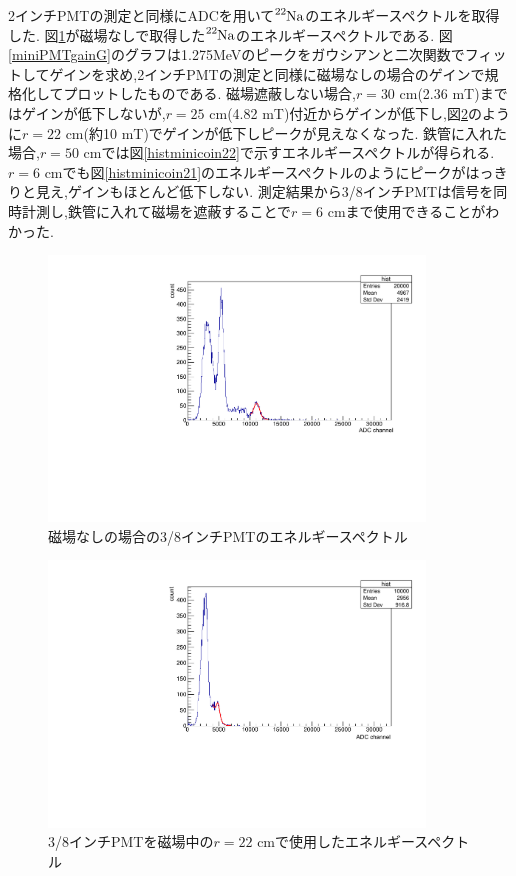 2インチPMTの測定と同様にADCを用いて$\ce{^{22}Na}$のエネルギースペクトルを取得した.
図\ref{histminicoincidence2}が磁場なしで取得した$\ce{^{22}Na}$のエネルギースペクトルである.
図\ref{miniPMTgainG}のグラフは1.275MeVのピークをガウシアンと二次関数でフィットしてゲインを求め,2インチPMTの測定と同様に磁場なしの場合のゲインで規格化してプロットしたものである.
磁場遮蔽しない場合,$r=30$ cm(2.36 mT)まではゲインが低下しないが,$r=25$ cm(4.82 mT)付近からゲインが低下し,図\ref{histminicoout22}のように$r=22$ cm(約10 mT)でゲインが低下しピークが見えなくなった.
鉄管に入れた場合,$r=50$ cmでは図\ref{histminicoin22}で示すエネルギースペクトルが得られる.$r=6$ cmでも図\ref{histminicoin21}のエネルギースペクトルのようにピークがはっきりと見え,ゲインもほとんど低下しない.
測定結果から3/8インチPMTは信号を同時計測し,鉄管に入れて磁場を遮蔽することで$r=6$ cmまで使用できることがわかった.

\begin{figure}[tbp]
	\centering
		\includegraphics[angle=-90,width=10cm]{fig/iguchi/minicoincidence2.pdf}
	\caption{磁場なしの場合の3/8インチPMTのエネルギースペクトル}
	\label{histminicoincidence2}
\end{figure}

\begin{figure}[tbp]
	\centering
		\includegraphics[angle=-90,width=10cm]{fig/iguchi/minicoout22.pdf}
	\caption{3/8インチPMTを磁場中の$r=22$ cmで使用したエネルギースペクトル}
	\label{histminicoout22}
\end{figure}

